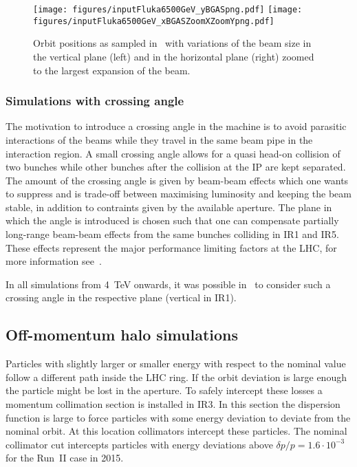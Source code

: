 \begin{figure}[!htb]
\begin{center}
  \texttt{[image: figures/inputFluka6500GeV\_yBGASpng.pdf]}
  \texttt{[image: figures/inputFluka6500GeV\_xBGASZoomXZoomYpng.pdf]}
\end{center}
\vspace{-0.6cm}
 \caption{Orbit positions as sampled in \fluka~with variations of the beam size in the vertical plane (left) and in the horizontal plane (right) zoomed to the largest expansion of the beam.
  \label{BGASflukaInp}}
\end{figure}


\subsubsection{Simulations with crossing angle}
The motivation to introduce a crossing angle in the machine is to avoid parasitic interactions of the beams while they travel in the same beam pipe in the interaction region. A small crossing angle allows for a quasi head-on collision of two bunches while other bunches after the collision at the IP are kept separated. The amount of the crossing angle is given by beam-beam effects which one wants to suppress and is trade-off between maximising luminosity and keeping the beam stable, in addition to contraints given by the available aperture. The plane in which the angle is introduced is chosen such that one can compensate partially long-range beam-beam effects from the same bunches colliding in IR1 and IR5. These effects represent the major performance limiting factors at the LHC, for more information see~\cite{wherrSlides2013,wernerLHCreport}.

In all simulations from 4~TeV onwards, it was possible in \fluka~to consider such a crossing angle in the respective plane (vertical in IR1).

\subsection{Off-momentum halo simulations}
Particles with slightly larger or smaller energy with respect to the nominal value follow a different path inside the LHC ring. If the orbit deviation is large enough the particle might be lost in the aperture. To safely intercept these losses a momentum collimation section is installed in IR3. In this section the dispersion function is large to force particles with some energy deviation to deviate from the nominal orbit. At this location collimators intercept these particles. The nominal collimator cut intercepts particles with energy deviations above $\delta p/p = 1.6\cdot 10^{-3}$ for the Run~II case in 2015.


